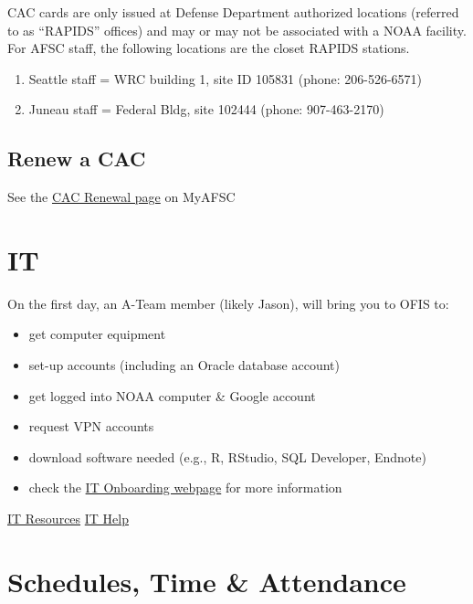 \documentclass[
  letterpaper,
  DIV=11,
  numbers=noendperiod]{scrreprt}
\providecommand{\tightlist}{%
  \setlength{\itemsep}{0pt}\setlength{\parskip}{0pt}}\usepackage{longtable,booktabs,array}
\begin{document}
CAC cards are only issued at Defense Department authorized locations
(referred to as ``RAPIDS'' offices) and may or may not be associated
with a NOAA facility. For AFSC staff, the following locations are the
closet RAPIDS stations.

\begin{enumerate}
\def\labelenumi{\arabic{enumi}.}
\item
  Seattle staff = WRC building 1, site ID 105831 (phone: 206-526-6571)
\item
  Juneau staff = Federal Bldg, site 102444 (phone: 907-463-2170)
\end{enumerate}

\hypertarget{renew-a-cac}{%
\subsection{Renew a CAC}\label{renew-a-cac}}

See the
\href{https://sites.google.com/noaa.gov/myafsc/administrative/security/cac-renewal}{CAC
Renewal page} on MyAFSC

\hypertarget{it}{%
\section{IT}\label{it}}

On the first day, an A-Team member (likely Jason), will bring you to
OFIS to:

\begin{itemize}
\tightlist
\item
  get computer equipment
\item
  set-up accounts (including an Oracle database account)
\item
  get logged into NOAA computer \& Google account
\item
  request VPN accounts
\item
  download software needed (e.g., R, RStudio, SQL Developer, Endnote)
\item
  check the
  \href{https://sites.google.com/noaa.gov/myafsc/technology/onboarding-and-clearing-it}{IT
  Onboarding webpage} for more information
\end{itemize}

\href{https://sites.google.com/noaa.gov/myafsc/technology}{IT Resources}
\href{https://sites.google.com/noaa.gov/myafsc/technology/afsc-it-service-desk}{IT
Help}

\hypertarget{schedules-time-attendance}{%
\section{Schedules, Time \&
Attendance}\label{schedules-time-attendance}}
\end{document}
